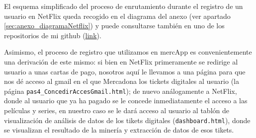 \documentclass[a4paper,12pt]{report}
\begin{document}
	El esquema simplificado del proceso de enrutamiento durante el registro de un usuario en NetFlix queda recogido en el diagrama del anexo (ver apartado \ref{sec:anexo_diagramaNetflix}) y puede consultarse también en uno de los repositorios de mi github (\href{https://www.github.com/miApp}{link}). 
	
	Asimismo, el proceso de registro que utilizamos en mercApp es convenientemente una derivación de este mismo: si bien en NetFlix primeramente se redirige al usuario a unas cartas de pago, nosotros aquí le llevamos a una página para que nos dé acceso al gmail en el que Mercadona los tickets digitales al usuario (la página  \texttt{pas4\_ConcedirAccesGmail.html}); de nuevo análogamente a NetFlix, donde al usuario que ya ha pagado se le concede inmediatamente el acceso a las películas y series,  en nuestro caso se le dará acceso al usuario al tablón de visualización de análisis de datos de los tikets digitales  (\texttt{dashboard.html}), donde se visualizan el resultado de la minería y extracción de datos de esos tikets. 
	
\end{document}
